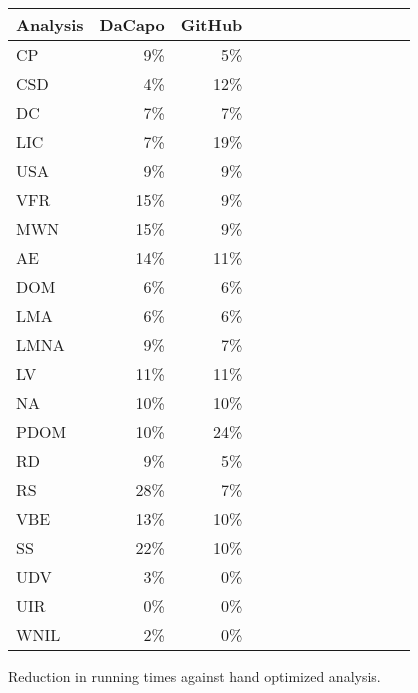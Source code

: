 \begin{figure}%
\centering
\scriptsize
\begin{tabular}{lrrrrrr|rrrrrr}
\toprule
\multicolumn{1}{l}{Analysis} & \multicolumn{1}{c|}{DaCapo}                    & \multicolumn{1}{c}{GitHub} \\
\midrule
\multicolumn{1}{l}{CP} & \cellcolor{lightblue}9\%  & \cellcolor{lightblue}5\%  \\
\multicolumn{1}{l}{CSD} & \cellcolor{lightblue}4\%  & \cellcolor{lightblack}12\% \\
\multicolumn{1}{l}{DC} & \cellcolor{lightblue}7\%  & \cellcolor{lightblue}7\%  \\
\multicolumn{1}{l}{LIC} & \cellcolor{lightblue}7\%  & \cellcolor{lightblack}19\% \\
\multicolumn{1}{l}{USA} & \cellcolor{lightblue}9\%  & \cellcolor{lightblue}9\% \\
\multicolumn{1}{l}{VFR} & \cellcolor{lightblack}15\%  & \cellcolor{lightblue}9\% \\
\multicolumn{1}{l}{MWN} & \cellcolor{lightblack}15\%  & \cellcolor{lightblue}9\% \\
\multicolumn{1}{l}{AE} & \cellcolor{lightblack}14\%  &  \cellcolor{lightblack}11\% \\
\multicolumn{1}{l}{DOM} & \cellcolor{lightblue}6\%  & \cellcolor{lightblue}6\% \\
\multicolumn{1}{l}{LMA} & \cellcolor{lightblue}6\%  & \cellcolor{lightblue}6\% \\
\multicolumn{1}{l}{LMNA} & \cellcolor{lightblue}9\%  & \cellcolor{lightblue}7\% \\
\multicolumn{1}{l}{LV} & \cellcolor{lightblack}11\%  & \cellcolor{lightblack}11\%  \\
\multicolumn{1}{l}{NA} & \cellcolor{lightblack}10\%  & \cellcolor{lightblack}10\%  \\
\multicolumn{1}{l}{PDOM} & \cellcolor{lightblack}10\%  & \cellcolor{lightblack}24\% \\
\multicolumn{1}{l}{RD} & \cellcolor{lightblue}9\%  & \cellcolor{lightblue}5\% \\
\multicolumn{1}{l}{RS} & \cellcolor{lightblack}28\%  & \cellcolor{lightblue}7\% \\
\multicolumn{1}{l}{VBE} & \cellcolor{lightblack}13\%  & \cellcolor{lightblack}10\% \\
\multicolumn{1}{l}{SS} & \cellcolor{lightblack}22\%  & \cellcolor{lightblack}10\%  \\
\multicolumn{1}{l}{UDV} &  \cellcolor{lightblue}3\%   &  \cellcolor{lightblue}0\%  \\
\multicolumn{1}{l}{UIR} &  \cellcolor{lightblue}0\%   &  \cellcolor{lightblue}0\%  \\
\multicolumn{1}{l}{WNIL} &  \cellcolor{lightblue}2\%   &  \cellcolor{lightblue}0\% \\
\bottomrule
\end{tabular}%
\caption{Reduction in running times against hand optimized analysis.}
\label{fig:reduction-oopsla}
\end{figure}
